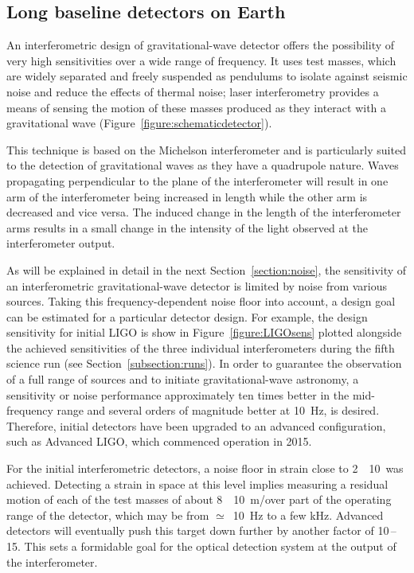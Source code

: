 \subsection{Long baseline detectors on Earth}
\label{subsection:earth} 

An interferometric design of gravitational-wave detector offers the possibility
of very high sensitivities over a wide range of frequency. It uses test masses,
which are widely separated and freely suspended as pendulums to isolate against
seismic noise and reduce the effects of thermal noise; laser interferometry
provides a means of sensing the motion of these masses produced as they interact
with a gravitational wave (Figure~\ref{figure:schematicdetector}).

  This technique is based on the Michelson interferometer and is particularly
suited to the detection of gravitational waves as they have a quadrupole nature.
Waves propagating perpendicular to the plane of the interferometer will result
in one arm of the interferometer being increased in length while the other arm
is decreased and vice versa. The induced change in the length of the
interferometer arms results in a small change in the intensity of the light
observed at the interferometer output.


As will be explained in detail in the next Section~\ref{section:noise},
the sensitivity of an interferometric gravitational-wave detector is
limited by noise from various sources. Taking this frequency-dependent
noise floor into account, a design goal can be estimated for a
particular detector design. For example, the design sensitivity for
initial LIGO is show in Figure~\ref{figure:LIGOsens} plotted alongside
the achieved sensitivities of the three individual interferometers
during the fifth science run (see Section~\ref{subsection:runs}). In order to
guarantee the observation of a full range of sources and to initiate
gravitational-wave astronomy, a sensitivity or noise performance
approximately ten times better in the mid-frequency range and several
orders of magnitude better at 10~Hz, is desired. Therefore, initial
detectors have been upgraded to an advanced configuration, such as
Advanced LIGO, which commenced operation in 2015.

  For the initial interferometric detectors, a noise floor in strain
close to 2~\texttimes~10~\Hz was achieved. Detecting a
strain in space at this level implies measuring a residual motion of
each of the test masses of about 8~\texttimes~10~m/\Hz over
part of the operating range of the detector, which may be from
$\simeq$~10~Hz to a few kHz. Advanced detectors will eventually push this
target down further by another factor of 10\,--\,15. This sets a
formidable goal for the optical detection system at the output of the
interferometer.
